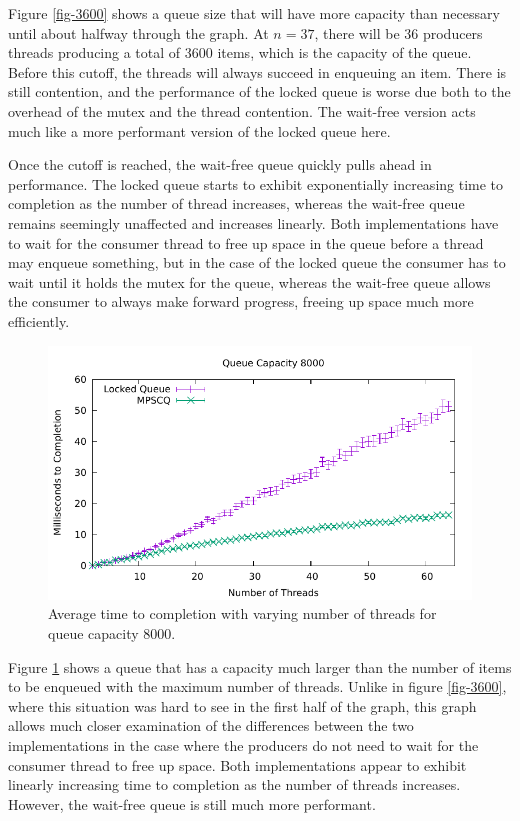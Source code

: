 \documentclass[12pt]{article}
\begin{document}
Figure \ref{fig-3600} shows a queue size that will have more capacity than necessary
until about halfway through the graph. At $n = 37$, there will be 36 producers
threads producing a total of 3600 items, which is the capacity of the queue.
Before this cutoff, the threads will always succeed in enqueuing an item.
There is still contention, and the performance of the locked queue is worse
due both to the overhead of the mutex and the thread contention. The wait-free
version acts much like a more performant version of the locked queue here.

Once the cutoff is reached, the wait-free queue quickly pulls ahead in
performance. The locked queue starts to exhibit exponentially increasing
time to completion as the number of thread increases, whereas the wait-free
queue remains seemingly unaffected and increases linearly. Both implementations
have to wait for the consumer thread to free up space in the queue before
a thread may enqueue something, but in the case of the locked queue the
consumer has to wait until it holds the mutex for the queue, whereas the
wait-free queue allows the consumer to always make forward progress, freeing
up space much more efficiently.

\begin{figure}[h]
	\centering 
	\includegraphics[width=170mm]{data_8000.pdf}
	\caption{Average time to completion with varying number of threads for queue capacity 8000.}
	\label{fig-8000}
\end{figure}

Figure \ref{fig-8000} shows a queue that has a capacity much larger than the
number of items to be enqueued with the maximum number of threads. Unlike
in figure \ref{fig-3600}, where this situation was hard to see in the first
half of the graph, this graph allows much closer examination of the differences
between the two implementations in the case where the producers do not need to
wait for the consumer thread to free up space. Both implementations appear
to exhibit linearly increasing time to completion as the number of threads
increases. However, the wait-free queue is still much more performant.
\end{document}
